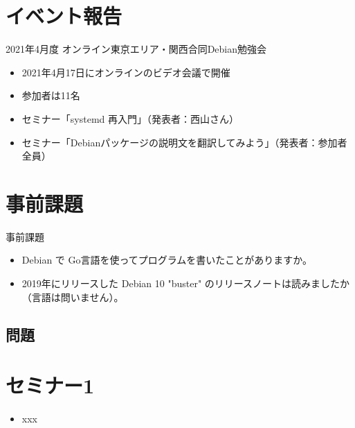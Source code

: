 \section{イベント報告}

\begin{frame}{2021年4月度 オンライン東京エリア・関西合同Debian勉強会}
\begin{itemize}
\item 2021年4月17日にオンラインのビデオ会議で開催
\item 参加者は11名
\item セミナー「systemd 再入門」（発表者：西山さん）
\item セミナー「Debianパッケージの説明文を翻訳してみよう」（発表者：参加者全員）
\end{itemize}
\end{frame}


\section{事前課題}


\begin{frame}{事前課題}
  \begin{itemize}
   \item Debian で Go言語を使ってプログラムを書いたことがありますか。
   \item 2019年にリリースした Debian 10 "buster" のリリースノートは読みましたか（言語は問いません）。
  \end{itemize}
\end{frame}

{\footnotesize
  
}

\subsection{問題}


\section{セミナー1}

\begin{frame}{}
  \begin{itemize}
  \item xxx
  \end{itemize}
\end{frame}

